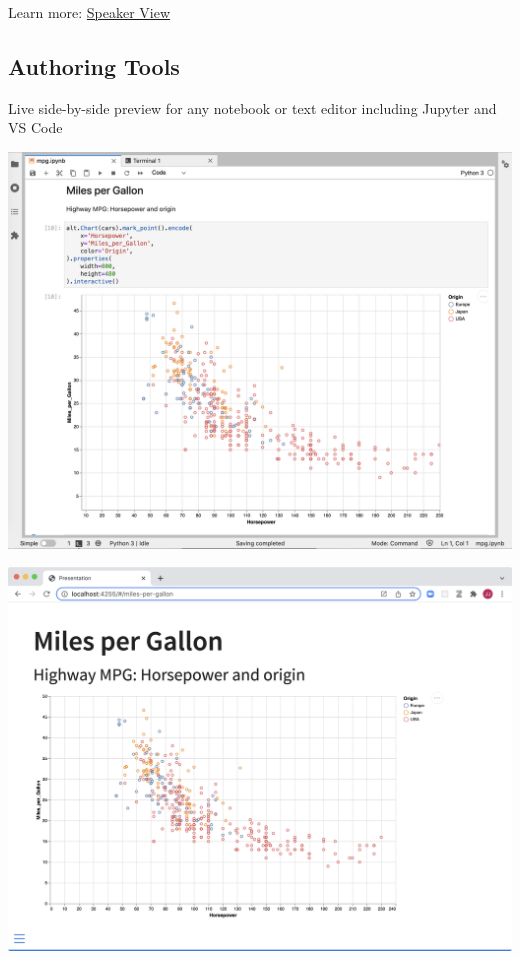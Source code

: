 \documentclass[
  letterpaper,
  DIV=11,
  numbers=noendperiod]{scrartcl}
\begin{document}
Learn more:
\href{https://quarto.org/docs/presentations/revealjs/presenting.html\#speaker-view}{Speaker
View}

\hypertarget{authoring-tools}{%
\subsection{Authoring Tools}\label{authoring-tools}}

Live side-by-side preview for any notebook or text editor including
Jupyter and VS Code

\includegraphics{images/jupyter-edit.png}

\includegraphics{images/jupyter-preview.png}
\end{document}
